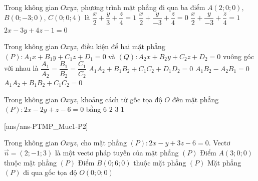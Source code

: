 \begin{ex}%
Trong không gian $Oxyz$, phương trình mặt phẳng đi qua ba điểm $A(2; 0; 0)$, $B(0; -3; 0)$, $C(0; 0; 4)$ là
\choice
{$\dfrac{x}{2} + \dfrac{y}{3} + \dfrac{z}{4} = 1$}
{$\dfrac{x}{2} + \dfrac{y}{-3} + \dfrac{z}{4} = 0$}
{\True $\dfrac{x}{2} + \dfrac{y}{-3} + \dfrac{z}{4} = 1$}
{$2x - 3y + 4z - 1 = 0$}
\end{ex}

\begin{ex}%
Trong không gian $Oxyz$, điều kiện để hai mặt phẳng $(P)\colon A_1x + B_1y + C_1z + D_1 = 0$ và $(Q)\colon A_2x + B_2y + C_2z + D_2 = 0$ vuông góc với nhau là
\choice
{$\dfrac{A_1}{A_2} = \dfrac{B_1}{B_2} = \dfrac{C_1}{C_2}$}
{$A_1A_2 + B_1B_2 + C_1C_2 + D_1D_2 = 0$}
{$A_1B_2 - A_2B_1 = 0$}
{\True $A_1A_2 + B_1B_2 + C_1C_2 = 0$}
\end{ex}

\begin{ex}%
Trong không gian $Oxyz$, khoảng cách từ gốc tọa độ $O$ đến mặt phẳng $(P)\colon 2x - 2y + z - 6 = 0$ bằng
\choice
{$6$}
{\True $2$}
{$3$}
{$1$}
\end{ex}


\cauds
{}[ans/ans-PTMP_Muc1-P2]

\begin{ex}%
Trong không gian $Oxyz$, cho mặt phẳng $(P)\colon 2x - y + 3z - 6 = 0$.
\choiceTF
{\True Vectơ $\overrightarrow{n} = (2; -1; 3)$ là một vectơ pháp tuyến của mặt phẳng $(P)$}
{\True Điểm $A(3; 0; 0)$ thuộc mặt phẳng $(P)$}
{Điểm $B(0; 6; 0)$ thuộc mặt phẳng $(P)$}
{Mặt phẳng $(P)$ đi qua gốc tọa độ $O(0; 0; 0)$}
\end{ex}

